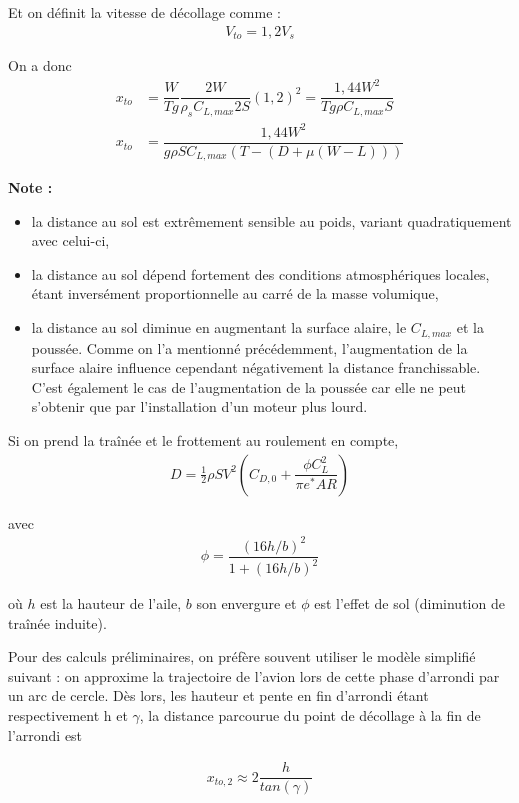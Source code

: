 \documentclass{report}
\begin{document}
Et on définit la vitesse de décollage comme :
\begin{eqnarray}
V_{to}=1,2V_s
\end{eqnarray}

On a donc 
\begin{eqnarray}
x_{to} &= \dfrac{W}{Tg}\dfrac{2W}{\rho_sC_{L,max} 2S}(1,2)^2 = \dfrac{1,44 W^2}{T g \rho C_{L,max} S}\\
x_{to} &= \dfrac{1,44 W^2}{g\rho S C_{L,max}(T-(D+\mu(W-L)))} 
\end{eqnarray}

\textbf{Note :}\begin{itemize}
    \item la distance au sol est extrêmement sensible au poids, variant quadratiquement avec celui-ci,
    \item la distance au sol dépend fortement des conditions atmosphériques locales, étant inversément proportionnelle au carré de la masse volumique,
    \item la distance au sol diminue en augmentant la surface alaire, le $C_{L,max}$ et la poussée. Comme on l'a mentionné précédemment, l'augmentation de la surface alaire influence cependant négativement la distance franchissable. C'est également le cas de l'augmentation de la poussée car elle ne peut s'obtenir que par l'installation d'un moteur plus lourd.
\end{itemize}

Si on prend la traînée et le frottement au roulement en compte, 
\begin{eqnarray}
D=\frac{1}{2}\rho S V^2 \left(C_{D,0}+\dfrac{\phi C_L^2}{\pi e^* AR}\right)
\end{eqnarray}

avec
\begin{eqnarray}
\phi = \dfrac{(16h/b)^2}{1+(16h/b)^2}
\end{eqnarray}

où $h$ est la hauteur de l'aile, $b$ son envergure et $\phi$ est l'effet de sol (diminution de traînée induite).

Pour des calculs préliminaires, on préfère souvent utiliser le modèle simplifié suivant : on approxime la trajectoire de l’avion lors de cette phase d’arrondi par un arc de cercle. Dès lors, les hauteur et pente en fin d’arrondi étant respectivement h et $\gamma$, la distance parcourue du point de décollage à la fin de l’arrondi est

\begin{eqnarray}
x_{to,2} \approx 2\dfrac{h}{tan(\gamma)}
\end{eqnarray}
\end{document}
